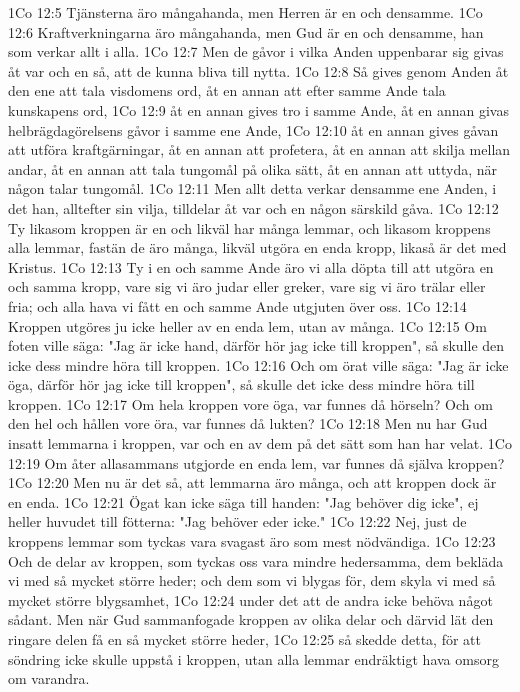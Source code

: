1Co 12:5  Tjänsterna äro mångahanda, men Herren är en och densamme.
1Co 12:6  Kraftverkningarna äro mångahanda, men Gud är en och densamme, han som verkar allt i alla.
1Co 12:7  Men de gåvor i vilka Anden uppenbarar sig givas åt var och en så, att de kunna bliva till nytta.
1Co 12:8  Så gives genom Anden åt den ene att tala visdomens ord, åt en annan att efter samme Ande tala kunskapens ord,
1Co 12:9  åt en annan gives tro i samme Ande, åt en annan givas helbrägdagörelsens gåvor i samme ene Ande,
1Co 12:10  åt en annan gives gåvan att utföra kraftgärningar, åt en annan att profetera, åt en annan att skilja mellan andar, åt en annan att tala tungomål på olika sätt, åt en annan att uttyda, när någon talar tungomål.
1Co 12:11  Men allt detta verkar densamme ene Anden, i det han, alltefter sin vilja, tilldelar åt var och en någon särskild gåva.
1Co 12:12  Ty likasom kroppen är en och likväl har många lemmar, och likasom kroppens alla lemmar, fastän de äro många, likväl utgöra en enda kropp, likaså är det med Kristus.
1Co 12:13  Ty i en och samme Ande äro vi alla döpta till att utgöra en och samma kropp, vare sig vi äro judar eller greker, vare sig vi äro trälar eller fria; och alla hava vi fått en och samme Ande utgjuten över oss.
1Co 12:14  Kroppen utgöres ju icke heller av en enda lem, utan av många.
1Co 12:15  Om foten ville säga: "Jag är icke hand, därför hör jag icke till kroppen", så skulle den icke dess mindre höra till kroppen.
1Co 12:16  Och om örat ville säga: "Jag är icke öga, därför hör jag icke till kroppen", så skulle det icke dess mindre höra till kroppen.
1Co 12:17  Om hela kroppen vore öga, var funnes då hörseln? Och om den hel och hållen vore öra, var funnes då lukten?
1Co 12:18  Men nu har Gud insatt lemmarna i kroppen, var och en av dem på det sätt som han har velat.
1Co 12:19  Om åter allasammans utgjorde en enda lem, var funnes då själva kroppen?
1Co 12:20  Men nu är det så, att lemmarna äro många, och att kroppen dock är en enda.
1Co 12:21  Ögat kan icke säga till handen: "Jag behöver dig icke", ej heller huvudet till fötterna: "Jag behöver eder icke."
1Co 12:22  Nej, just de kroppens lemmar som tyckas vara svagast äro som mest nödvändiga.
1Co 12:23  Och de delar av kroppen, som tyckas oss vara mindre hedersamma, dem bekläda vi med så mycket större heder; och dem som vi blygas för, dem skyla vi med så mycket större blygsamhet,
1Co 12:24  under det att de andra icke behöva något sådant. Men när Gud sammanfogade kroppen av olika delar och därvid lät den ringare delen få en så mycket större heder,
1Co 12:25  så skedde detta, för att söndring icke skulle uppstå i kroppen, utan alla lemmar endräktigt hava omsorg om varandra.
